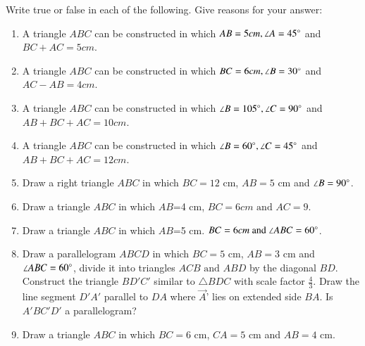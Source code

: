 Write true or false in each of the following. Give reasons for your answer:
\begin{enumerate}[label=\thesubsection.\arabic*,ref=\thesubsection.\theenumi,resume*]
\item A triangle $ABC$ can be constructed in which $AB = 5cm, \angle A =45\degree$ and $BC + AC = 5cm$.
\item A triangle $ABC$ can be constructed in which $BC = 6cm, \angle B =30\degree$ and $AC - AB=4cm$.
\item A triangle $ABC$ can be constructed in which $\angle B =105\degree,\angle C =90\degree$ and $AB + BC + AC = 10cm$.        
\item A triangle $ABC$ can be constructed in which $\angle B =60\degree, \angle C =45 \degree$ and $AB + BC + AC = 12cm$.           
\item Draw a right triangle ${ABC}$ in which $BC=12$ cm, $AB=5$ cm and $\angle{B}=90\degree$.
\item Draw a triangle ${ABC}$ in which $AB$=4 cm, $BC=6 cm\text{ and }AC=9$. 
\item Draw a triangle ${ABC}$ in which $AB$=5 cm. $BC=6 cm\text{ and }\angle {ABC}=60\degree$. 
\item Draw a parallelogram ${ABCD}$ in which $BC=5$ cm, $AB=3$ cm and $\angle{ABC}=60\degree$, divide it into triangles ${ACB}\text{ and }{ABD}$ by the diagonal $BD$. 
Construct the triangle $BD'C'$ similar to $\triangle{BDC}$ with scale factor $\frac{4}{3}$. Draw the line segment $D'A'$ parallel to $DA$ where $\vec{A}$' lies on extended side $BA$. Is $A'BC'D'$ a parallelogram? 
\item Draw a triangle ${ABC}$ in which $BC=6$ cm, $CA=5$ cm and $AB=4$ cm. 
\end{enumerate}
